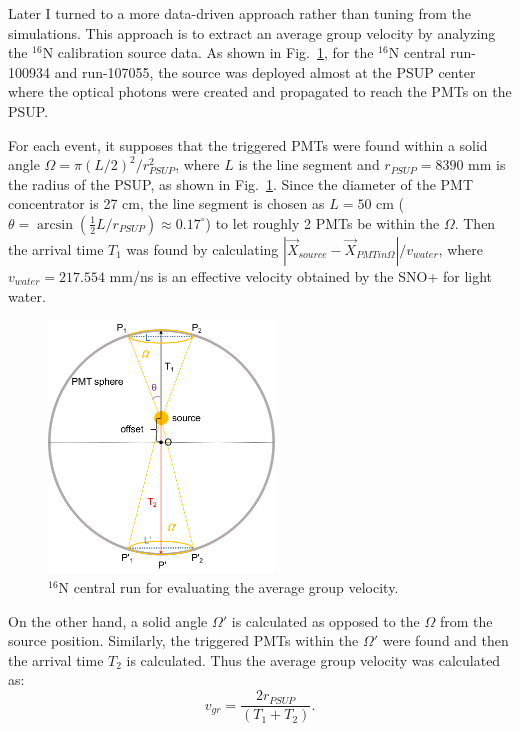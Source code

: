 Later I turned to a more data-driven approach rather than tuning from the simulations. This approach is to extract an average group velocity by analyzing the $^{16}$N calibration source data. As shown in Fig.~\ref{fig:n16_groupVeloctiy}, for the $^{16}$N central run-100934 and run-107055, the source was deployed almost at the PSUP center where the optical photons were created and propagated to reach the PMTs on the PSUP. 

For each event, it supposes that the triggered PMTs were found within a solid angle $\Omega=\pi(L/2)^2/r^2_{PSUP}$, where $L$ is the line segment and $r_{PSUP}=8390$ mm is the radius of the PSUP, as shown in Fig.~\ref{fig:n16_groupVeloctiy}. Since the diameter of the PMT concentrator is 27 cm, the line segment is chosen as $L = 50$ cm ($\theta=\arcsin(\frac{1}{2}L/r_{PSUP})\approx 0.17^\circ$) to let roughly 2 PMTs be within the $\Omega$. Then the arrival time $T_1$ was found by calculating $|\vec{X}_{source}-\vec{X}_{PMTin\Omega}|/v_{water}$, where $v_{water}=217.554$ mm/ns is an effective velocity obtained by the SNO+ for light water\cite{coulter2013modelling}.

\begin{figure}[!htb]
	\centering
	\includegraphics[width=6cm]{n16_groupVelocity.png}
	\caption{$^{16}$N central run for evaluating the average group velocity.}
	\label{fig:n16_groupVeloctiy}
\end{figure}

On the other hand, a solid angle $\Omega'$ is calculated as opposed to the $\Omega$ from the source position. Similarly, the triggered PMTs within the $\Omega'$ were found and then the arrival time $T_2$ is calculated. Thus the average group velocity was calculated as:
\begin{equation}
v_{gr}=\frac{2 r_{PSUP}}{(T_1+T_2)}.
\end{equation}

